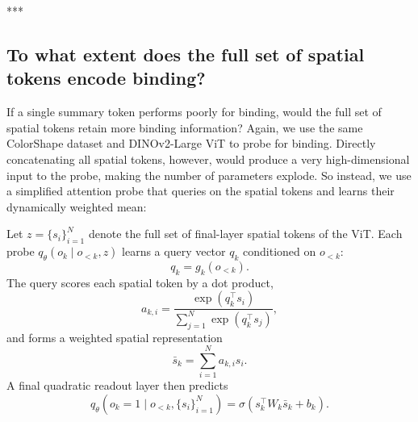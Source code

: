 \documentclass{article}
\theoremstyle{plain}
\theoremstyle{definition}
\theoremstyle{remark}
\begin{document}
\begin{table}[H]
\centering
\caption{\textbf{Probe-estimated binding information $\mathbf{B}_{\mathcal{O}}(Z)$, conditional binding information $\mathbf{B}^{*}_{\mathcal{O}, \mathcal{F}}(Z)$, and their normalized forms $\boldsymbol{\beta}_{\mathcal{O}}(Z)$ and $\boldsymbol{\beta}^{*}_{\mathcal{O}, \mathcal{F}}(Z)$}, recorded on the test set. $H(O)=39.9$ bits and $H(F)=7.0$ bits on this test set. All conditional results use the loss of the quadratic feature probe for the $H(F\mid Z)$ term, varying the object code probe type.}
\label{tab:binding_information}
\end{table}
***




\subsection{To what extent does the full set of spatial tokens encode binding?}
\label{spatial}

If a single summary token performs poorly for binding, would the full set of spatial tokens retain more binding information? Again, we use the same ColorShape dataset and DINOv2-Large ViT to probe for binding. Directly concatenating all spatial tokens, however, would produce a very high-dimensional input to the probe, making the number of parameters explode. So instead, we use a simplified attention probe that queries on the spatial tokens and learns their dynamically weighted mean:

Let $z=\{s_i\}_{i=1}^N$ denote the full set of final-layer spatial tokens of the ViT. Each probe $q_\theta(o_k\mid o_{<k}, z)$ learns a query vector $q_k$ conditioned on $o_{<k}$:
\[
q_k = g_k(o_{<k}).
\]
The query scores each spatial token by a dot product,
\[
a_{k,i}
=
\frac{\exp(q_k^\top s_i)}
{\sum_{j=1}^N \exp(q_k^\top s_j)},
\]
and forms a weighted spatial representation
\[
\bar{s}_k
=
\sum_{i=1}^N a_{k,i}s_i.
\]
A final quadratic readout layer then predicts
\[
q_\theta(o_k=1\mid o_{<k}, \{s_i\}_{i=1}^N)
=
\sigma({s}_k^\top W_k \bar{s}_k+b_k).
\]
\end{document}
